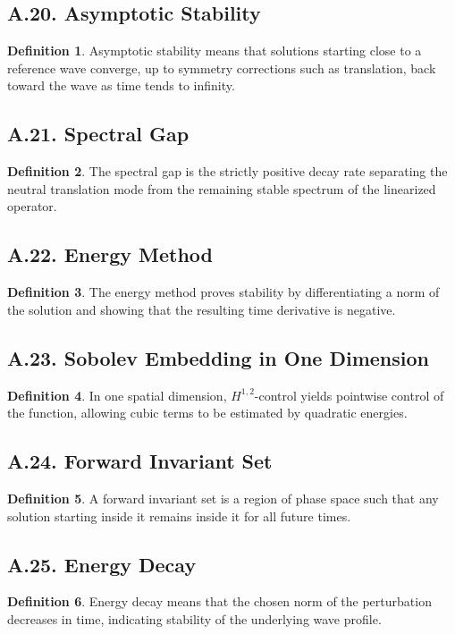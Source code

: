 \documentclass[11pt]{article}
\theoremstyle{definition}
\newtheorem{definition}{Definition}
\theoremstyle{remark}
\begin{document}
\subsection*{A.20. Asymptotic Stability}
\begin{definition}
Asymptotic stability means that solutions starting close to a reference wave converge, up to symmetry corrections such as translation, back toward the wave as time tends to infinity.
\end{definition}

\subsection*{A.21. Spectral Gap}
\begin{definition}
The spectral gap is the strictly positive decay rate separating the neutral translation mode from the remaining stable spectrum of the linearized operator.
\end{definition}

\subsection*{A.22. Energy Method}
\begin{definition}
The energy method proves stability by differentiating a norm of the solution and showing that the resulting time derivative is negative.
\end{definition}

\subsection*{A.23. Sobolev Embedding in One Dimension}
\begin{definition}
In one spatial dimension, \(H^{1,2}\)-control yields pointwise control of the function, allowing cubic terms to be estimated by quadratic energies.
\end{definition}

\subsection*{A.24. Forward Invariant Set}
\begin{definition}
A forward invariant set is a region of phase space such that any solution starting inside it remains inside it for all future times.
\end{definition}

\subsection*{A.25. Energy Decay}
\begin{definition}
Energy decay means that the chosen norm of the perturbation decreases in time, indicating stability of the underlying wave profile.
\end{definition}
\end{document}
